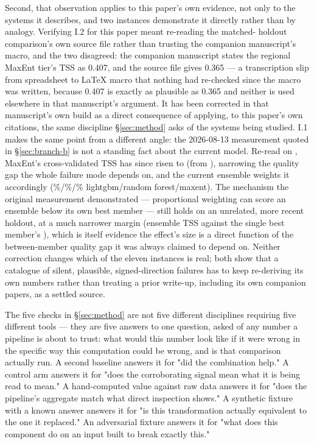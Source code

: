 Second, that observation applies to this paper's own evidence, not only to
the systems it describes, and two instances demonstrate it directly rather
than by analogy. Verifying I.2 for this paper meant re-reading the matched-
holdout comparison's own source file rather than trusting the companion
manuscript's macro, and the two disagreed: the companion manuscript states
the regional MaxEnt tier's TSS as 0.407, and the source file gives 0.365 ---
a transcription slip from spreadsheet to \LaTeX{} macro that nothing had
re-checked since the macro was written, because 0.407 is exactly as
plausible as 0.365 and neither is used elsewhere in that manuscript's
argument. It has been corrected in that manuscript's own build as a direct
consequence of applying, to this paper's own citations, the same discipline
\S\ref{sec:method} asks of the systems being studied. I.1 makes the same
point from a different angle: the 2026-08-13 measurement quoted in
\S\ref{sec:branch-b} is not a standing fact about the current model. Re-read
on \AsOf{}, MaxEnt's cross-validated TSS has since risen to
\EnsMaxentCVNow{} (from \EnsMaxentCVOld{}), narrowing the quality gap the
whole failure mode depends on, and the current ensemble weights it
accordingly (\EnsWeightLGBMNow{}\%/\EnsWeightRFNow{}\%/\EnsWeightMaxentNow{}\%
lightgbm/random forest/maxent). The mechanism the original measurement
demonstrated --- proportional weighting can score an ensemble below its own
best member --- still holds on an unrelated, more recent holdout, at a
much narrower margin (ensemble TSS \EnsHoldoutEnsembleNow{} against the
single best member's \EnsHoldoutBestNow{}), which is itself evidence the
effect's size is a direct function of the between-member quality gap it was
always claimed to depend on. Neither correction changes which of the eleven
instances is real; both show that a catalogue of silent, plausible,
signed-direction failures has to keep re-deriving its own numbers rather
than treating a prior write-up, including its own companion papers, as a
settled source.

 The five checks in \S\ref{sec:method} are not
five different disciplines requiring five different tools --- they are five
answers to one question, asked of any number a pipeline is about to trust:
what would this number look like if it were wrong in the specific way this
computation could be wrong, and is that comparison actually run. A second
baseline answers it for "did the combination help." A control arm answers
it for "does the corroborating signal mean what it is being read to mean."
A hand-computed value against raw data answers it for "does the pipeline's
aggregate match what direct inspection shows." A synthetic fixture with a
known answer answers it for "is this transformation actually equivalent to
the one it replaced." An adversarial fixture answers it for "what does this
component do on an input built to break exactly this."

